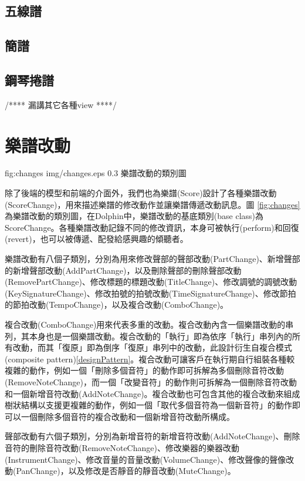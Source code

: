 \documentclass[12pt,a4paper,oneside]{report}
\begin{document}
\subsection{五線譜}
\subsection{簡譜}
\subsection{鋼琴捲譜}
/****
漏講其它各種view
****/

\section{樂譜改動}
\label{sec:changes}

\figurewithcaption
{fig:changes}
{img/changes.eps}
{0.3}
{樂譜改動的類別圖}

除了後端的模型和前端的介面外，我們也為樂譜(Score)設計了各種樂譜改動(ScoreChange)，用來描述樂譜的修改動作並讓樂譜傳遞改動訊息。圖 \ref{fig:changes}為樂譜改動的類別圖，在Dolphin中，樂譜改動的基底類別(base class)為ScoreChange。各種樂譜改動記錄不同的修改資訊，本身可被執行(perform)和回復(revert)，也可以被傳遞、配發給感興趣的傾聽者。

樂譜改動有八個子類別，分別為用來修改聲部的聲部改動(PartChange)、新增聲部的新增聲部改動(AddPartChange)，以及刪除聲部的刪除聲部改動(RemovePartChange)、修改標題的標題改動(TitleChange)、修改調號的調號改動(KeySignatureChange)、修改拍號的拍號改動(TimeSignatureChange)、修改節拍的節拍改動(TempoChange)，以及複合改動(ComboChange)。

複合改動(ComboChange)用來代表多重的改動。複合改動內含一個樂譜改動的串列，其本身也是一個樂譜改動。複合改動的「執行」即為依序「執行」串列內的所有改動，而其「復原」即為倒序「復原」串列中的改動，此設計衍生自複合模式(composite pattern)\ref{designPattern}。複合改動可讓客戶在執行期自行組裝各種較複雜的動作，例如一個「刪除多個音符」的動作即可拆解為多個刪除音符改動(RemoveNoteChange)，而一個「改變音符」的動作則可拆解為一個刪除音符改動和一個新增音符改動(AddNoteChange)。複合改動也可包含其他的複合改動來組成樹狀結構以支援更複雜的動作，例如一個「取代多個音符為一個新音符」的動作即可以一個刪除多個音符的複合改動和一個新增音符改動所構成。

聲部改動有六個子類別，分別為新增音符的新增音符改動(AddNoteChange)、刪除音符的刪除音符改動(RemoveNoteChange)、修改樂器的樂器改動(InstrumentChange)、修改音量的音量改動(VolumeChange)、修改聲像的聲像改動(PanChange)，以及修改是否靜音的靜音改動(MuteChange)。
\end{document}
